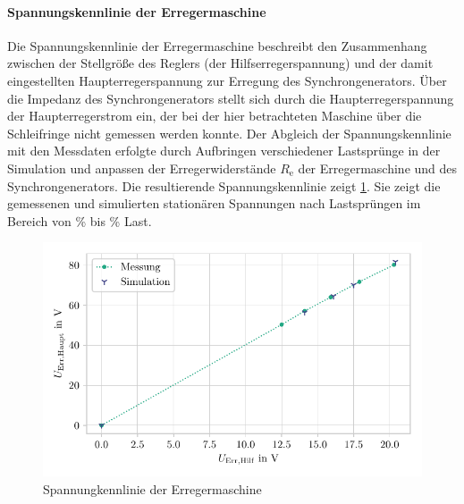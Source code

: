 \paragraph{Spannungskennlinie der Erregermaschine}
Die Spannungskennlinie der Erregermaschine beschreibt den Zusammenhang zwischen der Stellgröße des Reglers (der Hilfserregerspannung) und der damit eingestellten Haupterregerspannung zur Erregung des Synchrongenerators. Über die Impedanz des Synchrongenerators stellt sich durch die Haupterregerspannung der Haupterregerstrom ein, der bei der hier betrachteten Maschine über die Schleifringe nicht gemessen werden konnte. Der Abgleich der Spannungskennlinie mit den Messdaten erfolgte durch Aufbringen verschiedener Lastsprünge in der Simulation und anpassen der Erregerwiderstände $R_\mathrm{e}$ der Erregermaschine und des Synchrongenerators. Die resultierende Spannungskennlinie zeigt \cref{fig:Validierung-Erregermaschine}. Sie zeigt die gemessenen und simulierten stationären Spannungen nach Lastsprüngen im Bereich von \unit[0]{\%} bis \unit[125]{\%} Last.
\begin{figure}[h!]
    \centering
    \includegraphics{Bilder/Validierung_Erregermaschine.pdf}
    \caption{Spannungkennlinie der Erregermaschine}
    \label{fig:Validierung-Erregermaschine}
\end{figure}

